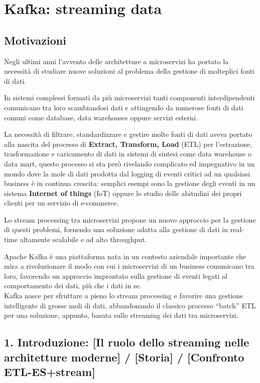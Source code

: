 \documentclass[]{article}
\date{}
\begin{document}
\section{Kafka: streaming data}\label{kafka-streaming-data}

\subsection{Motivazioni}\label{motivazioni}

Negli ultimi anni l'avvento delle architetture a microservizi ha portato
la necessità di studiare nuove soluzioni al problema della gestione di
molteplici fonti di dati.

In sistemi complessi formati da più microservizi tanti componenti
interdipendenti comunicano tra loro scambiandosi dati e attingendo da
numerose fonti di dati comuni come database, data warehouses oppure
servizi esterni.

La necessità di filtrare, standardizzare e gestire molte fonti di dati
aveva portato alla nascita del processo di \textbf{Extract, Transform,
Load} (ETL) per l'estrazione, trasformazione e caricamento di dati in
sistemi di sintesi come data warehouse o data mart, questo processo si
sta però rivelando complicato ed impegnativo in un mondo dove la mole di
dati prodotta dal logging di eventi critici ad un qualsiasi business è
in continua crescita: semplici esempi sono la gestione degli eventi in
un sistema \textbf{Internet of things} (IoT) oppure lo studio delle
abitudini dei propri clienti per un servizio di e-commerce.

Lo stream processing tra microservizi propone un nuovo approccio per la
gestione di questi problemi, fornendo una soluzione adatta alla gestione
di dati in real-time altamente scalabile e ad alto throughput.

Apache Kafka è una piattaforma nata in un contesto aziendale importante
che mira a rivoluzionare il modo con cui i microservizi di un business
comunicano tra loro, favorendo un approccio improntato sulla gestione di
eventi legati al comportamento dei dati, più che i dati in se.\\
Kafka nasce per sfruttare a pieno lo stream processing e favorire una
gestione intelligente di grosse moli di dati, abbandonando il classico
processo ``batch'' ETL per una soluzione, appunto, basata sullo
streaming dei dati tra microservizi.

\subsection{1. Introduzione: {[}Il ruolo dello streaming nelle
architetture moderne{]} / {[}Storia{]} / {[}Confronto
ETL-ES+stream{]}}\label{introduzione-il-ruolo-dello-streaming-nelle-architetture-moderne-storia-confronto-etl-esstream}
\end{document}
